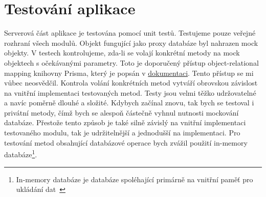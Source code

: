 \chapter{Testování aplikace}\label{ch:testovani-aplikace}

Serverová část aplikace je testována pomocí unit testů.
Testujeme pouze veřejné rozhraní všech modulů.
Objekt fungující jako proxy databáze byl nahrazen mock objekty.
V testech kontrolujeme, zda-li se volají konkrétní metody na mock objektech s očekávanými parametry.
Toto je doporučený přístup object-relational mapping knihovny Prisma, který je popsán v \href{https://www.prisma.io/docs/guides/testing/unit-testing}{dokumentaci}.
Tento přístup se mi vůbec neosvědčil.
Kontrola volání konkrétních metod vytváří obrovskou závislost na vnitřní implementaci testovaných metod.
Testy jsou velmi těžko udržovatelné a navíc poměrně dlouhé a složité.
Kdybych začínal znovu, tak bych se testoval i privátní metody, čímž bych se alespoň částečně vyhnul nutnosti mockování databáze.
Přestože tento způsob je také silně závislý na vnitřní implementaci testovaného modulu, tak je udržitelnější a jednodušší na implementaci.
Pro testování metod obsahující databázové operace bych zvážil použití in-memory databáze\footnote{In-memory databáze je databáze spoléhající primárně na vnitřní paměť pro ukládání dat~\cite{in-memory-db-definition}}.
